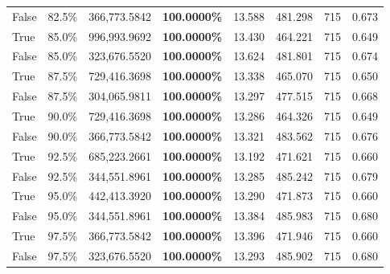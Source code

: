 \begin{table}[H]
\begin{tabular}{lllrllll}
\cline{1-8}
False & 82.5\% & 366,773.5842 & \bfseries \color{red} 100.0000\% & 13.588 & 481.298 & 715 & 0.673 \\
\cline{1-8}
True & 85.0\% & 996,993.9692 & \bfseries \color{red} 100.0000\% & 13.430 & 464.221 & 715 & 0.649 \\
\cline{1-8}
False & 85.0\% & 323,676.5520 & \bfseries \color{red} 100.0000\% & 13.624 & 481.801 & 715 & 0.674 \\
\cline{1-8}
True & 87.5\% & 729,416.3698 & \bfseries \color{red} 100.0000\% & 13.338 & 465.070 & 715 & 0.650 \\
\cline{1-8}
False & 87.5\% & \color{red} 304,065.9811 & \bfseries \color{red} 100.0000\% & 13.297 & 477.515 & 715 & 0.668 \\
\cline{1-8}
True & 90.0\% & 729,416.3698 & \bfseries \color{red} 100.0000\% & 13.286 & 464.326 & 715 & 0.649 \\
\cline{1-8}
False & 90.0\% & 366,773.5842 & \bfseries \color{red} 100.0000\% & 13.321 & 483.562 & 715 & 0.676 \\
\cline{1-8}
True & 92.5\% & 685,223.2661 & \bfseries \color{red} 100.0000\% & 13.192 & 471.621 & 715 & 0.660 \\
\cline{1-8}
False & 92.5\% & 344,551.8961 & \bfseries \color{red} 100.0000\% & 13.285 & 485.242 & 715 & 0.679 \\
\cline{1-8}
True & 95.0\% & 442,413.3920 & \bfseries \color{red} 100.0000\% & 13.290 & 471.873 & 715 & 0.660 \\
\cline{1-8}
False & 95.0\% & 344,551.8961 & \bfseries \color{red} 100.0000\% & 13.384 & 485.983 & 715 & 0.680 \\
\cline{1-8}
True & 97.5\% & 366,773.5842 & \bfseries \color{red} 100.0000\% & 13.396 & 471.946 & 715 & 0.660 \\
\cline{1-8}
False & 97.5\% & 323,676.5520 & \bfseries \color{red} 100.0000\% & 13.293 & 485.902 & 715 & 0.680 \\
\cline{1-8}
\bottomrule
\end{tabular}
\end{table}
